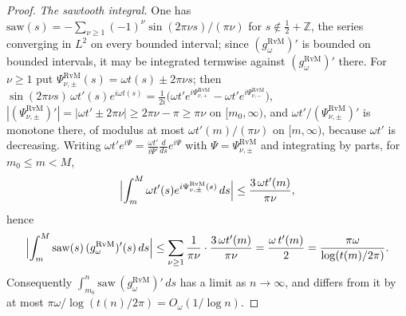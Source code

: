 \documentclass[11pt,a4paper]{article}
\numberwithin{equation}{section}
\theoremstyle{definition}
\theoremstyle{remark}
\begin{document}
\begin{proof}
\emph{The sawtooth integral.} One has $\mathrm{saw}(s)=-\sum_{\nu\ge1}(-1)^\nu\sin(2\pi\nu s)/(\pi\nu)$ for $s\notin\frac12+\mathbb Z$, the series converging in $L^2$ on every bounded interval; since $(g^{\mathrm{RvM}}_\omega)'$ is bounded on bounded intervals, it may be integrated termwise against $(g^{\mathrm{RvM}}_\omega)'$ there. For $\nu\ge1$ put $\Psi^{\mathrm{RvM}}_{\nu,\pm}(s)=\omega t(s)\pm2\pi\nu s$; then $\sin(2\pi\nu s)\,\omega t'(s)e^{i\omega t(s)}=\frac1{2i}\bigl(\omega t'e^{i\Psi^{\mathrm{RvM}}_{\nu,+}}-\omega t'e^{i\Psi^{\mathrm{RvM}}_{\nu,-}}\bigr)$, $|(\Psi^{\mathrm{RvM}}_{\nu,\pm})'|=|\omega t'\pm2\pi\nu|\ge2\pi\nu-\pi\ge\pi\nu$ on $[m_0,\infty)$, and $\omega t'/(\Psi^{\mathrm{RvM}}_{\nu,\pm})'$ is monotone there, of modulus at most $\omega t'(m)/(\pi\nu)$ on $[m,\infty)$, because $\omega t'$ is decreasing. Writing $\omega t'e^{i\Psi}=\frac{\omega t'}{i\Psi'}\frac d{ds}e^{i\Psi}$ with $\Psi=\Psi^{\mathrm{RvM}}_{\nu,\pm}$ and integrating by parts, for $m_0\le m<M$,
\begin{equation}
\Bigl|\int_m^M\omega t'(s)e^{i\Psi^{\mathrm{RvM}}_{\nu,\pm}(s)}\,ds\Bigr|\le\frac{3\,\omega t'(m)}{\pi\nu},
\end{equation}
hence
\begin{equation}
\Bigl|\int_m^M\mathrm{saw}(s)\,(g^{\mathrm{RvM}}_\omega)'(s)\,ds\Bigr|\le\sum_{\nu\ge1}\frac1{\pi\nu}\cdot\frac{3\,\omega t'(m)}{\pi\nu}=\frac{\omega\,t'(m)}2=\frac{\pi\omega}{\log(t(m)/2\pi)} .
\end{equation}
Consequently $\int_{m_0}^n\mathrm{saw}\,(g^{\mathrm{RvM}}_\omega)'\,ds$ has a limit as $n\to\infty$, and differs from it by at most $\pi\omega/\log(t(n)/2\pi)=O_\omega(1/\log n)$.


\end{proof}
\end{document}
